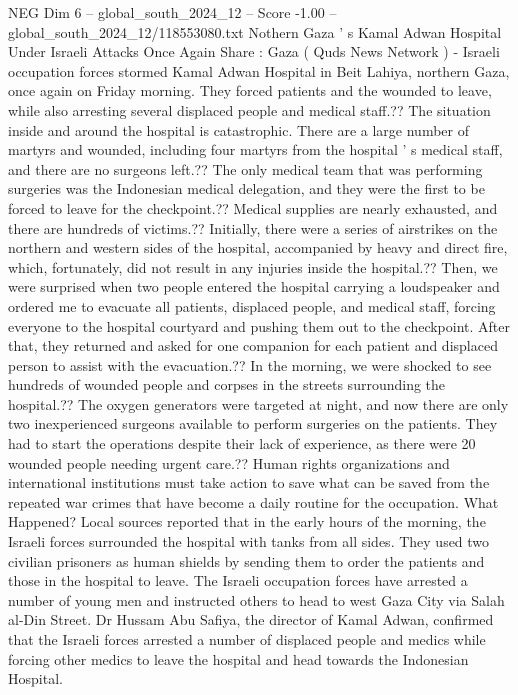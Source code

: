 \begin{textsample}{NEG Dim 6 – global\_south\_2024\_12 – Score -1.00 – global\_south\_2024\_12/118553080.txt}  \label{ex:f6_neg_029}
Nothern Gaza ' s Kamal Adwan Hospital Under Israeli Attacks Once Again Share : Gaza ( Quds News Network ) - Israeli occupation forces stormed Kamal Adwan Hospital in Beit Lahiya, northern Gaza, once again on Friday morning.
They forced patients and the wounded to leave, while also arresting several displaced people and medical staff.??
The situation inside and around the hospital is catastrophic.
There are a large number of martyrs and wounded, including four martyrs from the hospital ' s medical staff, and there are no surgeons left.??
The only medical team that was performing surgeries was the Indonesian medical delegation, and they were the first to be forced to leave for the checkpoint.??
Medical supplies are nearly exhausted, and there are hundreds of victims.??
Initially, there were a series of airstrikes on the northern and western sides of the hospital, accompanied by heavy and direct fire, which, fortunately, did not result in any injuries inside the hospital.??
Then, we were surprised when two people entered the hospital carrying a loudspeaker and ordered me to evacuate all patients, displaced people, and medical staff, forcing everyone to the hospital courtyard and pushing them out to the checkpoint.
After that, they returned and asked for one companion for each patient and displaced person to assist with the evacuation.??
In the morning, we were shocked to see hundreds of wounded people and corpses in the streets surrounding the hospital.??
The oxygen generators were targeted at night, and now there are only two inexperienced surgeons available to perform surgeries on the patients.
They had to start the operations despite their lack of experience, as there were 20 wounded people needing urgent care.??
Human rights organizations and international institutions must take action to save what can be saved from the repeated war crimes that have become a daily routine for the occupation.
What Happened?
Local sources reported that in the early hours of the morning, the Israeli forces surrounded the hospital with tanks from all sides.
They used two civilian prisoners as human shields by sending them to order the patients and those in the hospital to leave.
The Israeli occupation forces have arrested a number of young men and instructed others to head to west Gaza City via Salah al-Din Street.
Dr Hussam Abu Safiya, the director of Kamal Adwan, confirmed that the Israeli forces arrested a number of displaced people and medics while forcing other medics to leave the hospital and head towards the Indonesian Hospital.

\end{textsample}
